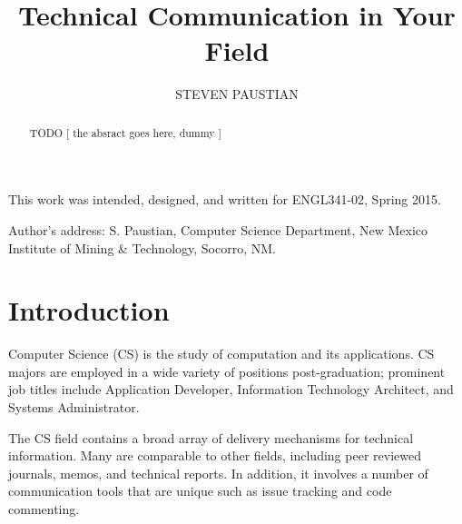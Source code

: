 \documentclass[prodmode,acmtecs]{acmsmall} %
\begin{document}

\title{Technical Communication in Your Field}
\author{STEVEN PAUSTIAN
}

\begin{abstract}
TODO [ the absract goes here, dummy ]
\end{abstract}





\begin{bottomstuff}
This work was intended, designed, and written for ENGL341-02, Spring 2015.

Author's address: S. Paustian, Computer Science Department,
New Mexico Institute of Mining \& Technology, Socorro, NM.
\end{bottomstuff}

\maketitle


\section{Introduction}
Computer Science (CS) is the study of computation and its applications.  CS majors are employed in a wide variety of positions post-graduation; prominent job titles include Application Developer, Information Technology Architect, and Systems Administrator.  \cite{payscale}

The CS field contains a broad array of delivery mechanisms for technical information.  Many are comparable to other fields, including peer reviewed journals, memos, and technical reports.  In addition, it involves a number of communication tools that are unique such as issue tracking and code commenting. 
\end{document}

